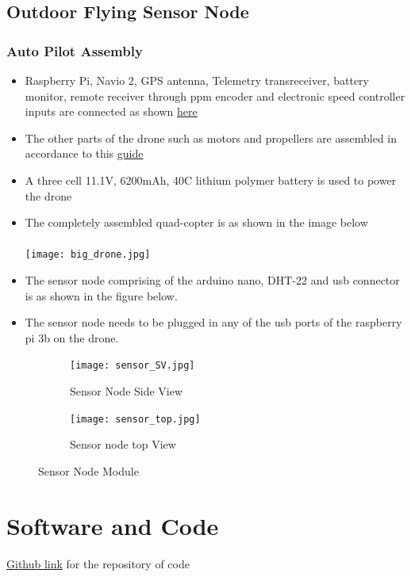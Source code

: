 \documentclass[a4paper,12pt,oneside]{book}
\begin{document}
\subsection*{Outdoor Flying Sensor Node}
\subsubsection*{Auto Pilot Assembly}
\begin{itemize}
\item Raspberry Pi, Navio 2, GPS antenna, Telemetry transreceiver, battery monitor, remote receiver through ppm encoder and electronic speed controller inputs are connected as shown \href{https://docs.emlid.com/navio2/ardupilot/hardware-setup/}{here}
\item The other parts of the drone such as motors and propellers are assembled in accordance to this \href{http://ardupilot.org/copter/docs/connect-escs-and-motors.html}{guide} 
\item A three cell 11.1V, 6200mAh, 40C lithium polymer battery is used to power the drone
\item The completely assembled quad-copter is as shown in the image below \\ \\
\centering
\texttt{[image: big\_drone.jpg]}
\end{itemize}

\begin{itemize}
\item The sensor node comprising of the arduino nano, DHT-22 and usb connector is as shown in the figure below.
\item The sensor node needs to be plugged in any of the usb ports of the raspberry pi 3b on the drone.
\end{itemize}
\begin{figure}
\centering
\begin{subfigure}{.6\textwidth}
  \centering
  \texttt{[image: sensor\_SV.jpg]}
  \caption{Sensor Node Side View}
  \label{fig:sub11}
\end{subfigure}%
\begin{subfigure}{.6\textwidth}
  \centering
  \texttt{[image: sensor\_top.jpg]}
  \caption{Sensor node top View}
  \label{fig:sub21}
\end{subfigure}
\caption{Sensor Node Module}
\label{fig:test1}
\end{figure}


\section{Software and Code}
\href{https://github.com/eYSIP-2018/Flying-Sensor-Node/}{Github link} for the repository of code
\end{document}
